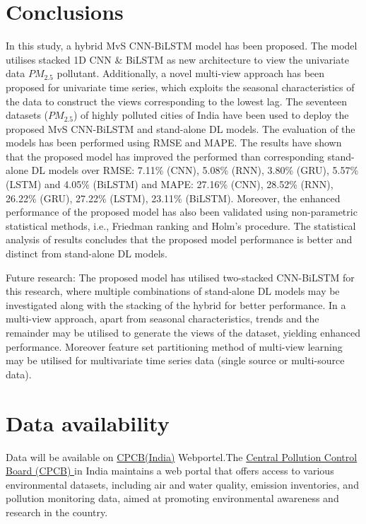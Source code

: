 \documentclass[a4paper, fleqn]{cas-sc}
\theoremstyle{definition}
\theoremstyle{remark}
\begin{document}
\section{Conclusions}
In this study, a hybrid MvS CNN-BiLSTM model has been proposed. The model utilises stacked 1D CNN \& BiLSTM as new architecture to view the univariate data $PM_{2.5}$ pollutant. Additionally, a novel multi-view approach has been proposed for univariate time series, which exploits the seasonal characteristics of the data to construct the views corresponding to the lowest lag. The seventeen datasets ($PM_{2.5}$) of highly polluted cities of India have been used to deploy the proposed MvS CNN-BiLSTM and stand-alone DL models. The evaluation of the models has been performed using RMSE and MAPE. The results have shown that the proposed model has improved the performed than corresponding stand-alone DL models over RMSE:  7.11\% (CNN), 5.08\% (RNN), 3.80\% (GRU), 5.57\% (LSTM) and 4.05\% (BiLSTM) and MAPE: 27.16\% (CNN), 28.52\% (RNN), 26.22\% (GRU), 27.22\% (LSTM), 23.11\% (BiLSTM). Moreover, the enhanced performance of the proposed model has also been validated using non-parametric statistical methods, i.e., Friedman ranking and Holm's procedure. The statistical analysis of results concludes that the proposed model performance is better and distinct from stand-alone DL models.

Future research: The proposed model has utilised two-stacked CNN-BiLSTM for this research, where multiple combinations of stand-alone DL models may be investigated along with the stacking of the hybrid for better performance. In a multi-view approach, apart from seasonal characteristics, trends and the remainder may be utilised to generate the views of the dataset, yielding enhanced performance. Moreover feature set partitioning method of multi-view learning may be utilised for multivariate time series data (single source or multi-source data).  


\section*{Data availability}
Data will be available on \href{https: //app.cpcbccr.com/ccr/#/caaqm-dashboard-all/caaqm-landing}{CPCB(India)} Webportel.The \href{https: //www.cpcb.nic.in/}{Central Pollution Control Board (CPCB) } in India maintains a web portal that offers access to various environmental datasets,  including air and water quality,  emission inventories,  and pollution monitoring data,  aimed at promoting environmental awareness and research in the country.
\end{document}
